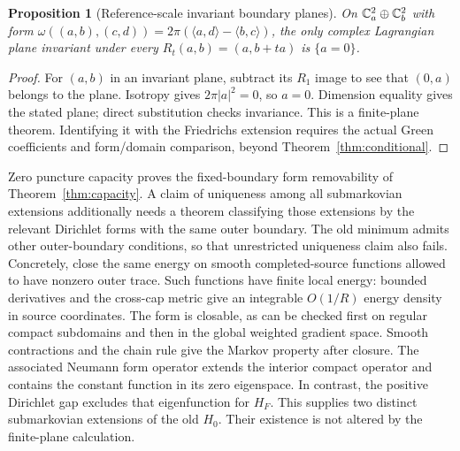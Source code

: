 \documentclass[11pt]{article}
\theoremstyle{readable}
\newtheorem{proposition}[theorem]{Proposition}
\theoremstyle{remark}\newtheorem{remark}[theorem]{Remark}
\begin{document}
\begin{proposition}[Reference-scale invariant boundary planes]
On $\mathbb C^2_a\oplus\mathbb C^2_b$ with form
$\omega((a,b),(c,d))=2\pi(\langle a,d\rangle-\langle b,c\rangle)$,
the only complex Lagrangian plane invariant under every
$R_t(a,b)=(a,b+ta)$ is $\{a=0\}$.
\end{proposition}
\begin{proof}
For $(a,b)$ in an invariant plane, subtract its $R_1$ image to see that
$(0,a)$ belongs to the plane. Isotropy gives $2\pi|a|^2=0$, so $a=0$.
Dimension equality gives the stated plane; direct substitution checks
invariance. This is a finite-plane theorem. Identifying it with the
Friedrichs extension requires the actual Green coefficients and form/domain
comparison, beyond Theorem~\ref{thm:conditional}.
\end{proof}
Zero puncture capacity proves the fixed-boundary form removability of
Theorem~\ref{thm:capacity}. A claim of uniqueness among all submarkovian
extensions additionally needs a theorem classifying those extensions by the
relevant Dirichlet forms with the same outer boundary. The old minimum admits
other outer-boundary conditions, so that unrestricted uniqueness claim also
fails. Concretely, close the same energy on smooth completed-source functions
allowed to have nonzero outer trace. Such functions have finite local energy:
bounded derivatives and the cross-cap metric give an integrable $O(1/R)$
energy density in source coordinates. The form is closable, as can be checked
first on regular compact subdomains and then in the global weighted gradient
space. Smooth contractions and the chain rule give the Markov property after
closure. The associated Neumann form operator extends the interior compact
operator and contains the constant function in its zero eigenspace. In
contrast, the positive Dirichlet gap excludes that eigenfunction for $H_F$.
This supplies two distinct submarkovian extensions of the old $H_0$.
Their existence is not altered by the finite-plane calculation.
\end{document}
